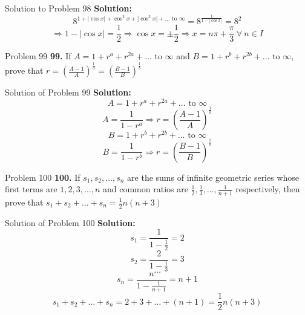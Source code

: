 \documentclass[aspectratio=1610,8pt]{beamer}
\begin{document}
\begin{frame}{Solution to Problem 98}
  \textbf{Solution:} $$8^{1 + |\cos x| + \cos^2 x + |\cos^3 x| + \ldots \text{~to~}\infty} = 8^{\frac{1}{1 - |\cos x|}} = 8^2$$
  $$\Rightarrow 1 - |\cos x| = \frac{1}{2}\Rightarrow \cos x = \pm \frac{1}{2} \Rightarrow x = n\pi + \frac{\pi}{3}~\forall~n\in I$$
\end{frame}
\begin{frame}{Problem 99}
  \textbf{99.} If $A = 1 + r^a + r^{2a} + \ldots \text{~to~}\infty$ and $B = 1 + r^b + r^{2b} + \ldots \text{~to~}\infty,$ prove
  that $r = \left(\frac{A - 1}{A}\right)^{\frac{1}{a}} = \left(\frac{B - 1}{B}\right)^{\frac{1}{b}}$
\end{frame}
\begin{frame}{Solution of Problem 99}
  \textbf{Solution:} $$A = 1 + r^a + r^{2a} + \ldots \text{~to~}\infty$$
  $$A = \frac{1}{1 - r^a} \Rightarrow r = \left(\frac{A - 1}{A}\right)^{\frac{1}{a}}$$
  $$B = 1 + r^b + r^{2b} + \ldots \text{~to~}\infty$$
  $$B = \frac{1}{1 - r^b} \Rightarrow r = \left(\frac{B - 1}{B}\right)^{\frac{1}{b}}$$
\end{frame}
\begin{frame}{Problem 100}
  \textbf{100.} If $s_1, s_2, \ldots, s_n$ are the sums of infinite geometric series whose first terms are $1, 2, 3, \ldots, n$ and
  common ratios are $\frac{1}{2}, \frac{1}{3}, \ldots, \frac{1}{n + 1}$ respectively, then prove that $s_1 + s_2 + \ldots + s_n =
  \frac{1}{2}n(n + 3)$
\end{frame}
\begin{frame}{Solution of Problem 100}
  \textbf{Solution:} $$s_1 = \frac{1}{1 - \frac{1}{2}} = 2$$
  $$s_2 = \frac{2}{1 - \frac{1}{3}} = 3$$
  $$\ldots$$
  $$s_n = \frac{n}{1 - \frac{1}{n + 1}} = n + 1$$
  $$s_1 + s_2 + \ldots + s_n = 2 + 3 + \ldots + (n + 1) = \frac{1}{2}n(n + 3)$$
\end{frame}
\end{document}
